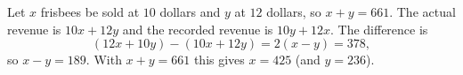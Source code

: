 Let $x$ frisbees be sold at $10$ dollars and $y$ at $12$ dollars, so $x+y=661$. The actual revenue is $10x+12y$ and the recorded revenue is $10y+12x$. The difference is
\[(12x+10y)-(10x+12y)=2(x-y)=378,\]
so $x-y=189$. With $x+y=661$ this gives $x=\boxed{425}$ (and $y=236$).
